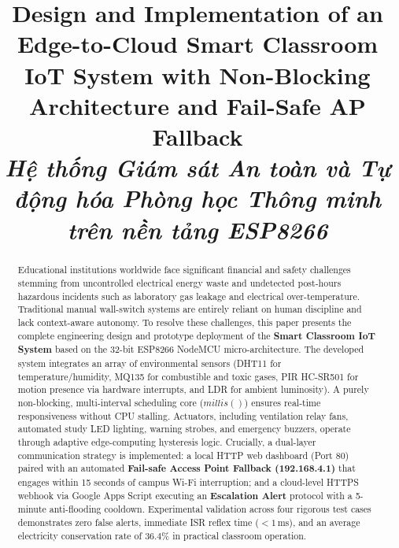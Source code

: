 \documentclass[conference]{IEEEtran}
\begin{document}
\title{Design and Implementation of an Edge-to-Cloud Smart Classroom IoT System with Non-Blocking Architecture and Fail-Safe AP Fallback\\
\large\textit{Hệ thống Giám sát An toàn và Tự động hóa Phòng học Thông minh trên nền tảng ESP8266}}

\author{
}

\maketitle

\begin{abstract}
Educational institutions worldwide face significant financial and safety challenges stemming from uncontrolled electrical energy waste and undetected post-hours hazardous incidents such as laboratory gas leakage and electrical over-temperature. Traditional manual wall-switch systems are entirely reliant on human discipline and lack context-aware autonomy. To resolve these challenges, this paper presents the complete engineering design and prototype deployment of the \textbf{Smart Classroom IoT System} based on the 32-bit ESP8266 NodeMCU micro-architecture. The developed system integrates an array of environmental sensors (DHT11 for temperature/humidity, MQ135 for combustible and toxic gases, PIR HC-SR501 for motion presence via hardware interrupts, and LDR for ambient luminosity). A purely non-blocking, multi-interval scheduling core ($millis()$) ensures real-time responsiveness without CPU stalling. Actuators, including ventilation relay fans, automated study LED lighting, warning strobes, and emergency buzzers, operate through adaptive edge-computing hysteresis logic. Crucially, a dual-layer communication strategy is implemented: a local HTTP web dashboard (Port 80) paired with an automated \textbf{Fail-safe Access Point Fallback (192.168.4.1)} that engages within 15 seconds of campus Wi-Fi interruption; and a cloud-level HTTPS webhook via Google Apps Script executing an \textbf{Escalation Alert} protocol with a 5-minute anti-flooding cooldown. Experimental validation across four rigorous test cases demonstrates zero false alerts, immediate ISR reflex time ($< 1\,\text{ms}$), and an average electricity conservation rate of $36.4\%$ in practical classroom operation.
\end{abstract}
\end{document}
